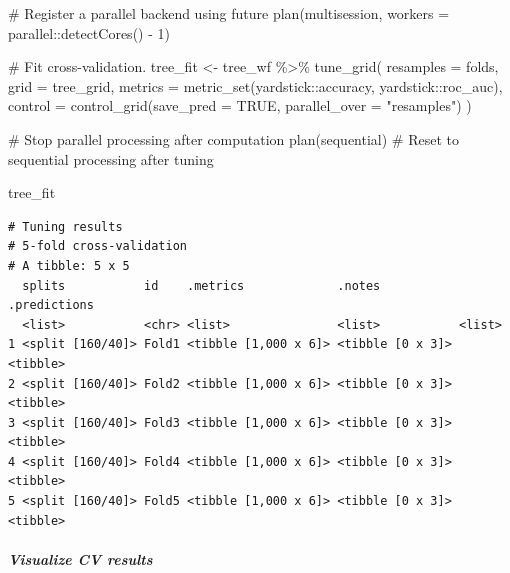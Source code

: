 \documentclass[
]{article}
\let\oldsubparagraph\subparagraph
\renewcommand{\subparagraph}[1]{\oldsubparagraph{#1}\mbox{}}
\newenvironment{Shaded}{\begin{snugshade}}{\end{snugshade}}
\newcommand{\AttributeTok}[1]{\textcolor[rgb]{0.40,0.45,0.13}{#1}}
\newcommand{\CommentTok}[1]{\textcolor[rgb]{0.37,0.37,0.37}{#1}}
\newcommand{\ConstantTok}[1]{\textcolor[rgb]{0.56,0.35,0.01}{#1}}
\newcommand{\DecValTok}[1]{\textcolor[rgb]{0.68,0.00,0.00}{#1}}
\newcommand{\FunctionTok}[1]{\textcolor[rgb]{0.28,0.35,0.67}{#1}}
\newcommand{\NormalTok}[1]{\textcolor[rgb]{0.00,0.23,0.31}{#1}}
\newcommand{\OtherTok}[1]{\textcolor[rgb]{0.00,0.23,0.31}{#1}}
\newcommand{\SpecialCharTok}[1]{\textcolor[rgb]{0.37,0.37,0.37}{#1}}
\newcommand{\StringTok}[1]{\textcolor[rgb]{0.13,0.47,0.30}{#1}}
\begin{document}
\begin{Shaded}
\begin{Highlighting}[]
\CommentTok{\# Register a parallel backend using future}
\FunctionTok{plan}\NormalTok{(multisession, }\AttributeTok{workers =}\NormalTok{ parallel}\SpecialCharTok{::}\FunctionTok{detectCores}\NormalTok{() }\SpecialCharTok{{-}} \DecValTok{1}\NormalTok{)}

\CommentTok{\# Fit cross{-}validation.}
\NormalTok{tree\_fit }\OtherTok{\textless{}{-}}\NormalTok{ tree\_wf }\SpecialCharTok{\%\textgreater{}\%}
  \FunctionTok{tune\_grid}\NormalTok{(}
    \AttributeTok{resamples =}\NormalTok{ folds,}
    \AttributeTok{grid =}\NormalTok{ tree\_grid,}
    \AttributeTok{metrics =} \FunctionTok{metric\_set}\NormalTok{(yardstick}\SpecialCharTok{::}\NormalTok{accuracy, yardstick}\SpecialCharTok{::}\NormalTok{roc\_auc),}
    \AttributeTok{control =} \FunctionTok{control\_grid}\NormalTok{(}\AttributeTok{save\_pred =} \ConstantTok{TRUE}\NormalTok{, }\AttributeTok{parallel\_over =} \StringTok{"resamples"}\NormalTok{)}
\NormalTok{  )}

\CommentTok{\# Stop parallel processing after computation}
\FunctionTok{plan}\NormalTok{(sequential)  }\CommentTok{\# Reset to sequential processing after tuning}

\NormalTok{tree\_fit}
\end{Highlighting}
\end{Shaded}

\begin{verbatim}
# Tuning results
# 5-fold cross-validation 
# A tibble: 5 x 5
  splits           id    .metrics             .notes           .predictions
  <list>           <chr> <list>               <list>           <list>      
1 <split [160/40]> Fold1 <tibble [1,000 x 6]> <tibble [0 x 3]> <tibble>    
2 <split [160/40]> Fold2 <tibble [1,000 x 6]> <tibble [0 x 3]> <tibble>    
3 <split [160/40]> Fold3 <tibble [1,000 x 6]> <tibble [0 x 3]> <tibble>    
4 <split [160/40]> Fold4 <tibble [1,000 x 6]> <tibble [0 x 3]> <tibble>    
5 <split [160/40]> Fold5 <tibble [1,000 x 6]> <tibble [0 x 3]> <tibble>    
\end{verbatim}

\hypertarget{visualize-cv-results}{%
\subparagraph{Visualize CV results}\label{visualize-cv-results}}
\end{document}
